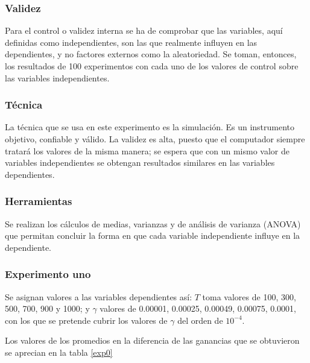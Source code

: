 \subsubsection{Validez}
Para el control o validez interna se ha de comprobar que las variables, aquí definidas como independientes, son las que realmente influyen en las dependientes, y no factores externos como la aleatoriedad. Se toman, entonces, los resultados de 100 experimentos con cada uno de los valores de control sobre las variables independientes.

\subsubsection{Técnica}
La técnica que se usa en este experimento es la simulación. Es un instrumento objetivo, confiable y válido. La validez es alta, puesto que el computador siempre tratará los valores de la misma manera; se espera que con un mismo valor de variables independientes se obtengan resultados similares en las variables dependientes.

\subsubsection{Herramientas}
Se realizan los cálculos de medias, varianzas y de análisis de varianza (ANOVA) que permitan concluir la forma en que cada variable independiente influye en la dependiente.

\subsubsection{Experimento uno}

Se asignan valores a las variables dependientes así: $T$ toma valores de 100, 300, 500, 700, 900 y 1000; y $\gamma$ valores de 0.00001, 0.00025, 0.00049, 0.00075, 0.0001, con los que se pretende cubrir los valores de $\gamma$ del orden de $10^{-4}$.

Los valores de los promedios en la diferencia de las ganancias que se obtuvieron se aprecian en la tabla \ref{exp0}

